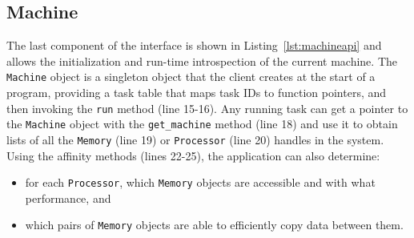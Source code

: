\subsection{Machine}
\label{subsec:machmodel}
The last component of the interface is shown in Listing~\ref{lst:machineapi} and allows the
initialization and run-time introspection
of the current machine.
The {\tt Machine} object is a singleton object that the client creates at the start of a
program, providing a task table that maps task IDs to function pointers,
and then invoking the {\tt run} method (line 15-16).
Any running task can get a pointer to the {\tt Machine} object with the
{\tt get\_machine} method (line 18) and use it to obtain lists of all the {\tt Memory} (line 19) or 
{\tt Processor} (line 20) handles in the system.  Using the affinity methods (lines 22-25),
the application can also determine:
\begin{itemize} \itemsep1pt \parskip0pt 
\item for each {\tt Processor}, which {\tt Memory} objects are accessible and with what performance, and
\item which pairs of {\tt Memory} objects are able to efficiently copy data between them.
\end{itemize}




